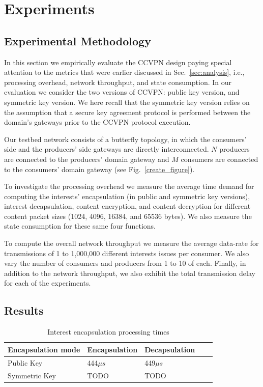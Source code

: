 \section{Experiments}

\subsection{Experimental Methodology}

In this section we empirically evaluate the CCVPN design paying special attention to the metrics that were earlier discussed in Sec.~\ref{sec:analysis}, i.e., processing overhead, network throughput, and state consumption. In our evaluation we consider the two versions of CCVPN: public key version, and symmetric key version. We here recall that the symmetric key version relies on the assumption that a secure key agreement protocol is performed between the domain's gateways prior to the CCVPN protocol execution.

Our testbed network consists of a butterfly topology, in which the consumers' side and the producers' side gateways are directly interconnected. $N$ producers are connected to the producers' domain gateway and $M$ consumers are connected to the consumers' domain gateway (see Fig.~\ref{create_figure}).

To investigate the processing overhead we measure the average time demand for computing the interests' encapsulation (in public and symmetric key versions), interest decapsulation, content encryption, and content decryption for different content packet sizes (1024, 4096, 16384, and 65536 bytes). We also measure the state consumption for these same four functions.

To compute the overall network throughput we measure the average data-rate for transmissions of 1 to 1,000,000 different interests issues per consumer. We also vary the number of consumers and producers from 1 to 10 of each. Finally, in addition to the network throughput, we also exhibit the total transmission delay for each of the experiments.

\subsection{Results}


\begin{table}[!h]
\centering
\caption{Interest encapsulation processing times}
\label{my-label}
\begin{tabular}{|l|l|l|l|l|}
\hline
Encapsulation mode   & Encapsulation & Decapsulation \\ \hline
Public Key  & 444$\mu s$           & 449$\mu s$           \\ \hline \cline{4-5} 
Symmetric Key & TODO          & TODO          \\ \hline
\end{tabular}
\end{table}




